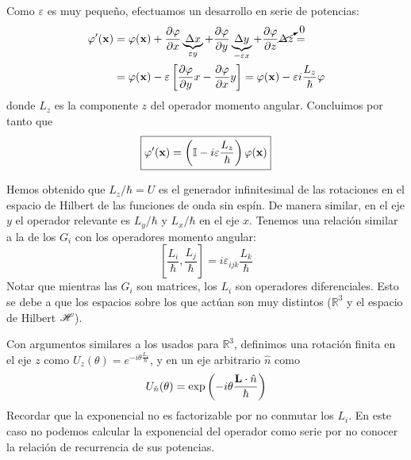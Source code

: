 Como $\varepsilon$ es muy pequeño, efectuamos un desarrollo en serie
de potencias:
\begin{equation}
  \begin{split}
    \varphi'(\bm{\mathrm{x}}) &= \varphi(\bm{\mathrm{x}}) + \pdv{\varphi}{x}
    \underbrace{\Delta x}_{\varepsilon y} + \pdv{\varphi}{y}
    \underbrace{\Delta y}_{-\varepsilon x} + \pdv{\varphi}{z}
    \cancelto{0}{\Delta z} = \\
    &= \varphi(\bm{\mathrm{x}}) - \varepsilon \left[ \pdv{\varphi}{y} x -
      \pdv{\varphi}{x}y \right] = \varphi(\bm{\mathrm{x}})-\varepsilon i \frac{L_z}{\hbar}\varphi
  \end{split}
\end{equation}
donde $L_z$ es la componente $z$ del operador momento angular.
Concluimos por tanto que
\begin{equation}
  \boxed{
    \varphi'(\bm{\mathrm{x}}) = \left( \mathbb{I}-i \varepsilon \frac{L_z}{\hbar} \right)\varphi(\bm{\mathrm{x}})
  }
\end{equation}

Hemos obtenido que $L_z/\hbar = U$ es el generador
infinitesimal de
las rotaciones en el espacio de Hilbert de las funciones de onda sin
espín. De manera similar, en el eje $y$ el operador relevante es
$L_y/\hbar$ y $L_x/\hbar$ en el eje $x$. Tenemos una relación similar
a la de los $G_i$ con los operadores momento angular:
\begin{equation}
  \left[ \frac{L_i}{\hbar}, \frac{L_j}{\hbar} \right] = i
  \varepsilon_{ijk} \frac{L_k}{\hbar}
\end{equation}
Notar que mientras las $G_i$ son matrices, los $L_i$ son operadores
diferenciales. Esto se debe a que los espacios sobre los que actúan
son muy distintos ($\mathbb{R}^3$ y el espacio de Hilbert $ \mathscr{H} $).

Con argumentos similares a los usados para $\mathbb{R}^3$, definimos
una rotación finita en el eje $z$ como $U_z(\theta) = e^{-i\theta
  \frac{L_z}{\hbar}}$, y en un eje arbitrario $\hat{n}$ como
\begin{equation}
  U_{\hat{n}} (\theta)= \exp \left(  {-i \theta
      \frac{\bm{\mathrm{L}}\cdot\hat{n}}{\hbar}} \right)
\end{equation}
Recordar que la exponencial no es factorizable por no conmutar los
$L_i$. En este caso no podemos calcular la exponencial del operador
como serie por no conocer la relación de recurrencia de sus potencias.

